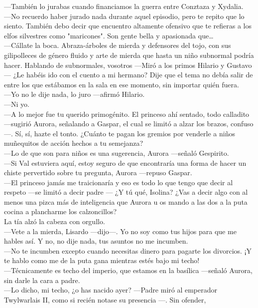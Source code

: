 \documentclass[
  letterpaper,
]{krantz}
\begin{document}
---También lo jurabas cuando financiamos la guerra entre Conztaza y
Xydalia.\\
---No recuerdo haber jurado nada durante aquel episodio, pero te repito
que lo siento. También debo decir que encuentro altamente ofensivo que
te refieras a los elfos silvestres como "maricones". Son gente bella y
apasionada que\ldots{}\\
---Cállate la boca. Abraza-árboles de mierda y defensores del tojo, con
sus gilipolleces de género fluido y arte de mierda que hasta un niño
subnormal podría hacer. Hablando de subnormales, vosotros ---Miró a los
primos Hilario y Gustavo --- ¿Le habéis ido con el cuento a mi hermano?
Dije que el tema no debía salir de entre los que estábamos en la sala en
ese momento, sin importar quién fuera.\\
---Yo no le dije nada, lo juro ---afirmó Hilario.\\
---Ni yo.\\
---A lo mejor fue tu querido primogénito. El princeso ahí sentado, todo
calladito ---sugirió Aurora, señalando a Gaspar, el cual se limitó a
alzar los brazos, confuso ---. Sí, sí, hazte el tonto. ¿Cuánto te pagan
los gremios por venderle a niños muñequitos de acción hechos a tu
semejanza?\\
---Lo de que son para niños es una sugerencia, Aurora ---señaló
Gespirito.\\
---Si Val estuviera aquí, estoy seguro de que encontraría una forma de
hacer un chiste pervertido sobre tu pregunta, Aurora ---repuso Gaspar.\\
---El princeso jamás me traicionaría y eso es todo lo que tengo que
decir al respeto ---se limitó a decir padre --- ¿Y tú qué, Isolina? ¿Vas
a decir algo con al menos una pizca más de inteligencia que Aurora u os
mando a las dos a la puta cocina a plancharme los calzoncillos?\\
La tía alzó la cabeza con orgullo.\\
---Vete a la mierda, Lisardo ---dijo---. Yo no soy como tus hijos para
que me hables así. Y no, no dije nada, tus asuntos no me incumben.\\
---No te incumben excepto cuando necesitas dinero para pagarte los
divorcios. ¡Y te hablo como me de la puta gana mientras estés bajo mi
techo!\\
---Técnicamente es techo del imperio, que estamos en la basílica
---señaló Aurora, sin darle la cara a padre.\\
---Lo dicho, mi techo, ¿o has nacido ayer? ---Padre miró al emperador
Twylwarlais II, como si recién notase su presencia ---. Sin ofender,
\end{document}
